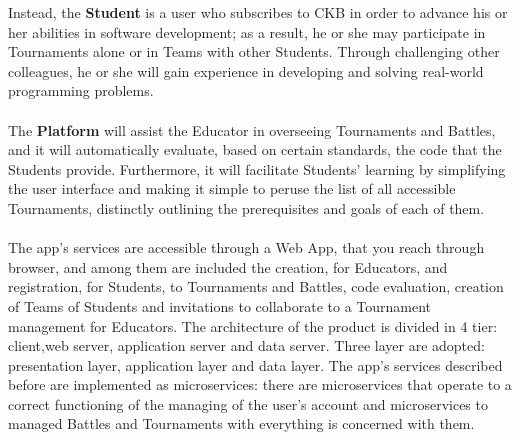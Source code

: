 Instead, the \textbf{Student} is a user who subscribes to CKB in order to advance his or her abilities in software development; as a result, he or she may participate in Tournaments alone or in Teams with other Students. Through challenging 
other colleagues, he or she will gain experience in developing and solving real-world programming problems.\\
\\
The \textbf{Platform} will assist the Educator in overseeing Tournaments and Battles, and it will automatically evaluate, based on certain standards, the code that the Students provide. Furthermore, it will facilitate Students' learning by 
simplifying the user interface and making it simple to peruse the list of all accessible Tournaments, distinctly outlining the prerequisites and goals of each of them.\\
\\
The app's services are accessible through a Web App, that you reach through browser, and among them are included the creation, for Educators, and registration, for Students, to Tournaments and Battles, code evaluation, creation of Teams of Students and invitations 
to collaborate to a Tournament management for Educators. 
The architecture of the product is divided in 4 tier: client,web server, application server and data server. Three layer are adopted: presentation layer, application layer and data layer.
The app's services described before are implemented as microservices: there are microservices that operate to a correct functioning of the managing of the user's account and microservices to managed
Battles and Tournaments with everything is concerned with them.
